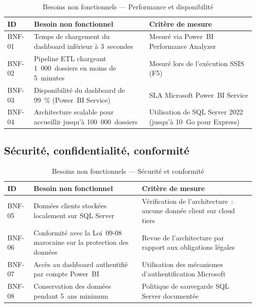 \documentclass[12pt, a4paper]{report}
\begin{document}
\begin{table}[H]
\centering
\caption{Besoins non fonctionnels --- Performance et disponibilité}
\label{tab:bnf_perf}
\renewcommand{\arraystretch}{1.6}
\begin{tabularx}{\textwidth}{p{1.5cm} X p{4cm}}
\toprule
\rowcolor{primary!12}
ID & Besoin non fonctionnel & Critère de mesure \\
\midrule
BNF-01 & Temps de chargement du dashboard inférieur à 3~secondes & Mesuré via Power~BI Performance Analyzer \\
BNF-02 & Pipeline ETL chargeant 1~000~dossiers en moins de 5~minutes & Mesuré lors de l'exécution SSIS (F5) \\
BNF-03 & Disponibilité du dashboard de 99~\% (Power~BI Service) & SLA Microsoft Power~BI Service \\
BNF-04 & Architecture scalable pour accueillir jusqu'à 100~000~dossiers & Utilisation de SQL Server 2022 (jusqu'à 10~Go pour Express) \\
\bottomrule
\end{tabularx}
\end{table}

\subsection{Sécurité, confidentialité, conformité}

\begin{table}[H]
\centering
\caption{Besoins non fonctionnels --- Sécurité et conformité}
\label{tab:bnf_secu}
\renewcommand{\arraystretch}{1.4}
\begin{tabularx}{\textwidth}{p{1.5cm} X p{4.5cm}}
\toprule
\rowcolor{primary!12}
ID & Besoin non fonctionnel & Critère de mesure \\
\midrule
BNF-05 & Données clients stockées localement sur SQL Server & Vérification de l'architecture~: aucune donnée client sur cloud tiers \\
BNF-06 & Conformité avec la Loi~09-08 marocaine sur la protection des données & Revue de l'architecture par rapport aux obligations légales~\cite{loi0908} \\
BNF-07 & Accès au dashboard authentifié par compte Power~BI & Utilisation des mécanismes d'authentification Microsoft \\
BNF-08 & Conservation des données pendant 5~ans minimum & Politique de sauvegarde SQL Server documentée \\
\bottomrule
\end{tabularx}
\end{table}
\end{document}
